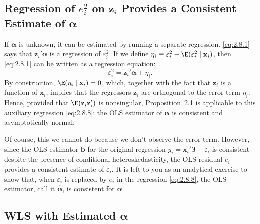 \subsection*{Regression of $e_i^2$ on $\mathbf{z}_i$ Provides a Consistent Estimate of
$\bm{\alpha}$}

If $\bm{\alpha}$ is unknown, it can be estimated by running a separate regression.
\eqref{eq:2.8.1} says that $\mathbf{z}_i' \bm{\alpha}$ is a regression of
$\varepsilon_i^2$.  If we define
$\eta_i \equiv \varepsilon_i^2 - \E(\varepsilon_i^2 \mid \mathbf{x}_i)$, then
\eqref{eq:2.8.1} can be written as a regression equation:
\begin{equation}
  \varepsilon_i^2 = \mathbf{z}_i' \bm{\alpha} + \eta_i.
  \label{eq:2.8.8}
\end{equation}
By construction, $\E(\eta_i \mid \mathbf{x}_i) = 0$, which, together with the fact that
$\mathbf{z}_i$ is a function of $\mathbf{x}_i$, implies that the regressors
$\mathbf{z}_i$ are orthogonal to the error term $\eta_i$.  Hence, provided that
$\E(\mathbf{z}_i \mathbf{z}_i')$ is nonsingular, Proposition~2.1 is applicable to this
auxiliary regression \eqref{eq:2.8.8}: the OLS estimator of $\bm{\alpha}$ is consistent
and asymptotically normal.

Of course, this we cannot do because we don't observe the error term.  However, since the
OLS estimator $\mathbf{b}$ for the original regression
$y_i = \mathbf{x}_i' \bm{\beta} + \varepsilon_i$ is consistent despite the presence of
conditional heteroskedasticity, the OLS residual $e_i$ provides a consistent estimate of
$\varepsilon_i$.  It is left to you as an analytical exercise to show that, when
$\varepsilon_i$ is replaced by $e_i$ in the regression \eqref{eq:2.8.8}, the OLS
estimator, call it $\hat{\bm{\alpha}}$, is consistent for $\bm{\alpha}$.

\subsection*{WLS with Estimated $\bm{\alpha}$}

